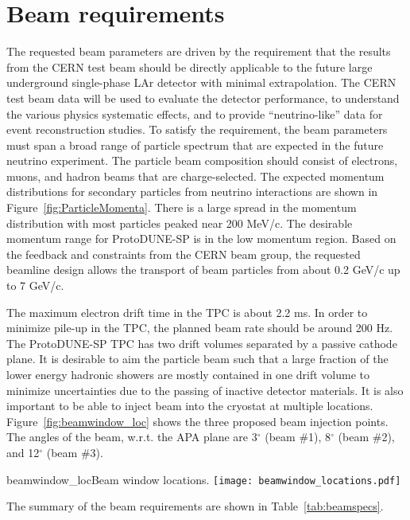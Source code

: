 \section{Beam requirements}
\label{sec:beamrequirements}

The requested beam parameters are driven by the requirement that the results from the CERN test beam should be directly applicable to the future large underground single-phase LAr detector with minimal extrapolation. The CERN test beam data will be used to evaluate the detector performance, to understand the various physics systematic effects, and to provide ``neutrino-like'' data for event reconstruction studies. To satisfy the requirement, the beam parameters must span a broad range of particle spectrum that are expected in the future neutrino experiment. The particle beam composition should consist of electrons, muons, and hadron beams that are charge-selected. The expected momentum distributions for secondary particles from neutrino interactions are shown in Figure~\ref{fig:ParticleMomenta}. There is a large spread in the momentum distribution with most particles peaked near 200 MeV/c.  The desirable momentum range for ProtoDUNE-SP  is in the low momentum region. Based on the feedback and constraints from the CERN beam group, the requested beamline design allows the transport of beam particles from about 0.2 GeV/c up to 7 GeV/c. 

The maximum electron drift time in the TPC is about 2.2 ms. In order to minimize pile-up in the TPC, the planned beam rate should be around 200 Hz.  The ProtoDUNE-SP TPC has two drift volumes separated by a passive cathode plane.
It is desirable to aim the particle beam such that a large fraction of the lower energy hadronic showers are mostly contained in one drift 
volume to minimize uncertainties due to the passing of inactive detector materials. It is also important to be able to inject beam into the cryostat at multiple locations. Figure~\ref{fig:beamwindow_loc} shows the three proposed beam injection points.  The angles of the beam, w.r.t. the APA plane are 3$^\circ$ (beam \#1), 8$^\circ$ (beam \#2), and 12$^\circ$ (beam \#3).
\begin{cdrfigure}{beamwindow_loc}{Beam window locations.}
  \texttt{[image: beamwindow\_locations.pdf]}
\end{cdrfigure}



The summary of the beam requirements are shown in Table~\ref{tab:beamspecs}.

